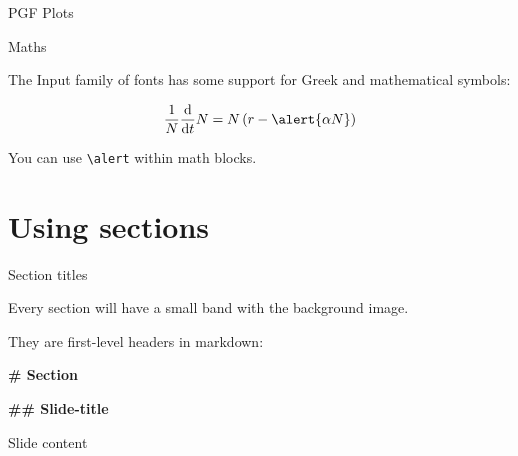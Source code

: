 \documentclass[12pt, compress, aspectratio=1610]{beamer}
\newenvironment{Shaded}{\begin{mdframed}}{\end{mdframed}}
\newcommand{\FunctionTok}[1]{\textcolor[HTML]{26A69A}{\textbf{{#1}}}}
\newcommand{\NormalTok}[1]{\textcolor[HTML]{212121}{{#1}}}
\let\OldTexttt\texttt
\renewcommand{\texttt}[1]{\OldTexttt{\color{codecolor}#1}}
\begin{document}
\begin{frame}{PGF Plots}

\centering


\end{frame}

\begin{frame}[fragile]{Maths}

The Input family of fonts has some support for Greek and mathematical
symbols:

\[
\frac{1}{N}\frac{\text{d}}{\text{d}t}N = N\left(r-\alert{\alpha N}\right)
\]

You can use \texttt{\textbackslash{}alert} within math blocks.

\end{frame}

\section{Using sections}\label{using-sections}

\begin{frame}[fragile]{Section titles}

Every section will have a small band with the background image.

They are first-level headers in markdown:

\begin{Shaded}
\begin{Highlighting}[]
\FunctionTok{# Section}

\FunctionTok{## Slide-title}

\NormalTok{Slide content}
\end{Highlighting}
\end{Shaded}

\end{frame}
\end{document}
